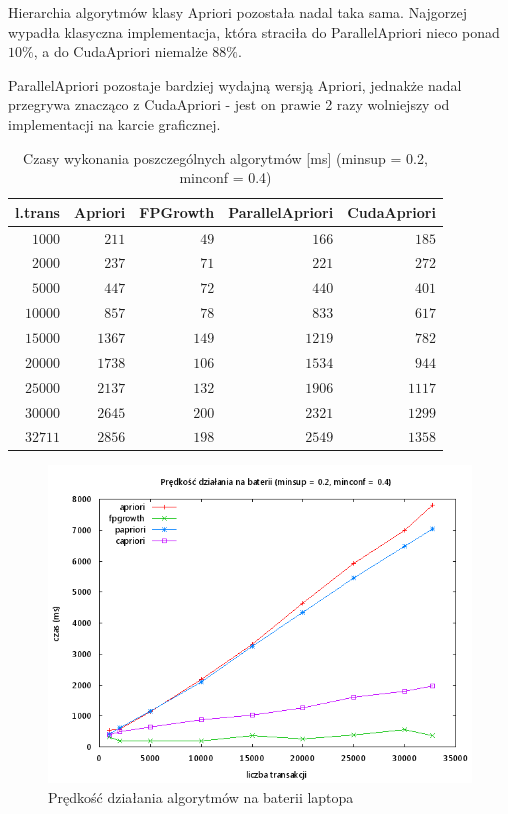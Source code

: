 Hierarchia algorytmów klasy Apriori pozostała nadal taka sama. Najgorzej wypadła klasyczna implementacja, która straciła do ParallelApriori nieco ponad $10\%$, a do CudaApriori niemalże $88\%$. 

ParallelApriori pozostaje bardziej wydajną wersją Apriori, jednakże nadal przegrywa znacząco z CudaApriori - jest on prawie 2 razy wolniejszy od implementacji na karcie graficznej.

\begin{table}
	\centering
	\begin{tabular}{r|r|r|r|r}
	\textbf{l.trans} & \textbf{Apriori} & \textbf{FPGrowth} & \textbf{ParallelApriori} & \textbf{CudaApriori}  \\ \hline
	$1000$ & $211$ & $49$ & $166$ & $185$ \\
	$2000$ & $237$ & $71$ & $221$ & $272$ \\
	$5000$ & $447$ & $72$ & $440$ & $401$ \\
	$10000$ & $857$ & $78$ & $833$ & $617$ \\
	$15000$ & $1367$ & $149$ & $1219$ & $782$ \\
	$20000$ & $1738$ & $106$ & $1534$ & $944$ \\
	$25000$ & $2137$ & $132$ & $1906$ & $1117$ \\
	$30000$ & $2645$ & $200$ & $2321$ & $1299$ \\
	$32711$ & $2856$ & $198$ & $2549$ & $1358$ \\
	\end{tabular}
	\caption{Czasy wykonania poszczególnych algorytmów [ms] (minsup = 0.2, minconf = 0.4)\label{tab:02_04}}
\end{table}

\begin{figure}[H]
\centering
\includegraphics[width=1.1\textwidth]{figures/06/02_04_bat.png}
\caption{Prędkość działania algorytmów na baterii laptopa\label{rys:02_04_bat}}
\end{figure}


